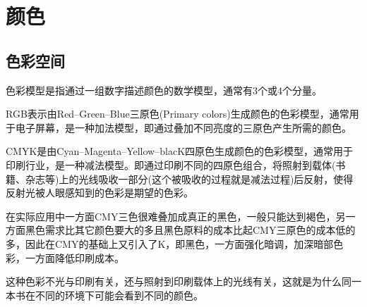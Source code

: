 
\chapter{颜色}
\label{chap:color}

\newcommand{\RGB}{{\color{red}R}{\color{green}G}{\color{blue}B}}
\newcommand{\CMY}{{\color{cyan}C}{\color{magenta}M}{\color{yellow}Y}}
\newcommand{\CMYK}{\CMY{}{\color{black}K}}


\section{色彩空间}
\label{sec:color-space}

\begin{definition}
  色彩模型是指通过一组数字描述颜色的数学模型，通常有3个或4个分量。
\end{definition}

\begin{example}
  \RGB{}表示由{\color{red}Red}--{\color{green}Green}--{\color{blue}Blue}三原色(Primary colors)生成颜色的色彩模型，通常用于电子屏幕，是一种加法模型，即通过叠加不同亮度的三原色产生所需的颜色。
\end{example}

\begin{example}[CMYK色彩模型]
  \CMYK{}是由{\color{cyan}Cyan}--{\color{magenta}Magenta}--{\color{yellow}Yellow}--{\color{black}blacK}四原色生成颜色的色彩模型，通常用于印刷行业，是一种减法模型。即通过印刷不同的四原色组合，将照射到载体(书籍、杂志等)上的光线吸收一部分(这个被吸收的过程就是减法过程)后反射，使得反射光被人眼感知到的色彩是期望的色彩。

  在实际应用中一方面\CMY{}三色很难叠加成真正的黑色，一般只能达到褐色，另一方面黑色需求比其它颜色要大的多且黑色原料的成本比起\CMY{}三原色的成本低的多，因此在\CMY{}的基础上又引入了K，即黑色，一方面强化暗调，加深暗部色彩，一方面降低印刷成本。

  这种色彩不光与印刷有关，还与照射到印刷载体上的光线有关，这就是为什么同一本书在不同的环境下可能会看到不同的颜色。
\end{example}

\begin{example}[HSV色彩模型]
  
\end{example}

